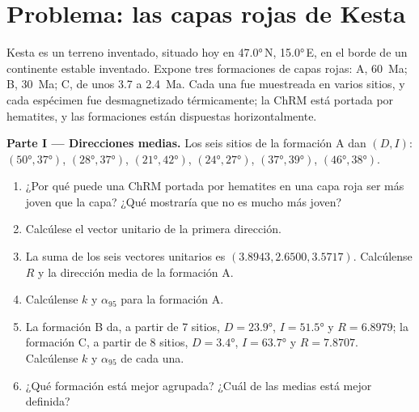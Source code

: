 \section{Problema: las capas rojas de Kesta}

\begin{problem}
\label{pb:b3:palaeomagnetism:1}
Kesta es un terreno inventado, situado hoy en \ang{47.0}\,N, \ang{15.0}\,E, en el borde
de un continente estable inventado. Expone tres formaciones de capas rojas: A,
\qty{60}{Ma}; B, \qty{30}{Ma}; C, de unos 3.7 a \qty{2.4}{Ma}. Cada una fue
muestreada en varios sitios, y cada espécimen fue desmagnetizado térmicamente; la
ChRM está portada por hematites, y las formaciones están dispuestas horizontalmente.

\medskip\noindent\textbf{Parte I --- Direcciones medias.} Los seis sitios de
la formación A dan $(D, I)$: $(\ang{50}, \ang{37})$, $(\ang{28}, \ang{37})$,
$(\ang{21}, \ang{42})$, $(\ang{24}, \ang{27})$, $(\ang{37}, \ang{39})$,
$(\ang{46}, \ang{38})$.
\begin{enumerate}
  \item ¿Por qué puede una ChRM portada por hematites en una capa roja ser más joven que la
        capa? ¿Qué mostraría que no es mucho más joven?
  \item Calcúlese el vector unitario de la primera dirección.
  \item La suma de los seis vectores unitarios es $(3.8943, 2.6500, 3.5717)$. Calcúlense $R$ y
        la dirección media de la formación A.
  \item Calcúlense $k$ y $\alpha_{95}$ para la formación A.
  \item La formación B da, a partir de 7 sitios, $D = \ang{23.9}$, $I = \ang{51.5}$ y
        $R = 6.8979$; la formación C, a partir de 8 sitios, $D = \ang{3.4}$, $I =
        \ang{63.7}$ y $R = 7.8707$. Calcúlense $k$ y $\alpha_{95}$ de cada una.
  \item ¿Qué formación está mejor agrupada? ¿Cuál de las medias está mejor definida?
\end{enumerate}


\end{problem}
